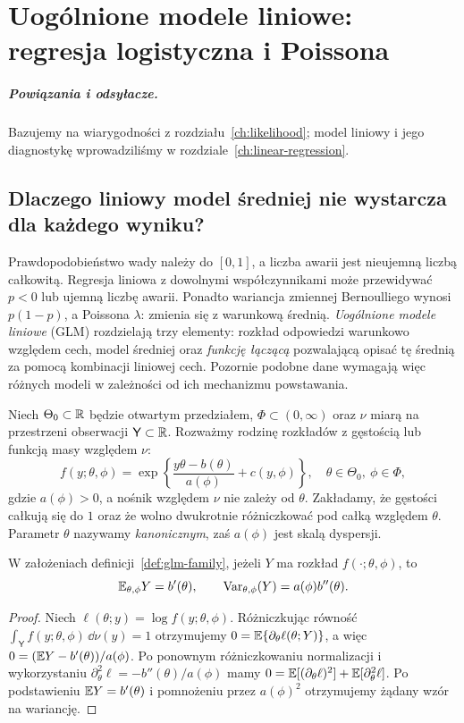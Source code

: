 \chapter{Uogólnione modele liniowe: regresja logistyczna i Poissona}
\label{ch:glm}
\paragraph{Powiązania i odsyłacze.} Bazujemy na wiarygodności z rozdziału~\ref{ch:likelihood}; model liniowy i jego diagnostykę wprowadziliśmy w rozdziale~\ref{ch:linear-regression}.


\section{Dlaczego liniowy model średniej nie wystarcza dla każdego wyniku?}
Prawdopodobieństwo wady należy do $[0,1]$, a liczba
awarii jest nieujemną liczbą całkowitą. Regresja
liniowa z dowolnymi współczynnikami może przewidywać
$p<0$ lub ujemną liczbę awarii. Ponadto wariancja
zmiennej Bernoulliego wynosi $p(1-p)$, a Poissona
$\lambda$: zmienia się z warunkową średnią.
\emph{Uogólnione modele liniowe} (GLM) rozdzielają
trzy elementy: rozkład odpowiedzi warunkowo względem
cech, model średniej oraz \emph{funkcję łączącą}
pozwalającą opisać tę średnią za pomocą kombinacji
liniowej cech. Pozornie podobne dane wymagają więc
różnych modeli w zależności od ich mechanizmu powstawania.

\begin{definicja}
\label{def:glm-family}
Niech $\Theta_0\subset\mathbb R$ będzie otwartym przedziałem,
$\Phi\subset(0,\infty)$ oraz $\nu$ miarą na przestrzeni
obserwacji $\mathsf Y\subset\mathbb R$. Rozważmy rodzinę
rozkładów z gęstością lub funkcją masy względem $\nu$:
\[
 f(y;\theta,\phi)=\exp\!\left\{
 \frac{y\theta-b(\theta)}{a(\phi)}+c(y,\phi)\right\},
 \quad \theta\in\Theta_0,\ \phi\in\Phi,
\]
gdzie $a(\phi)>0$, a nośnik względem $\nu$ nie zależy
od $\theta$. Zakładamy, że gęstości całkują się do $1$
oraz że wolno dwukrotnie różniczkować pod całką względem
$\theta$. Parametr $\theta$ nazywamy \emph{kanonicznym},
zaś $a(\phi)$ jest skalą dyspersji.
\end{definicja}

\begin{twierdzenie}
\label{thm:glm-moments}
W założeniach definicji~\ref{def:glm-family}, jeżeli
$Y$ ma rozkład $f(\cdot;\theta,\phi)$, to
\[
 \mathbb E_{\theta,\phi}Y=b'(\theta),\qquad
 \operatorname{Var}_{\theta,\phi}(Y)=a(\phi)b''(\theta).
\]
\end{twierdzenie}
\begin{proof}
Niech $\ell(\theta;y)=\log f(y;\theta,\phi)$.
Różniczkując równość
$\int_{\mathsf Y}f(y;\theta,\phi)\,\dd\nu(y)=1$
otrzymujemy
$0=\mathbb E\{\partial_\theta\ell(\theta;Y)\}$,
a więc $0=(\mathbb E Y-b'(\theta))/a(\phi)$.
Po ponownym różniczkowaniu normalizacji i
wykorzystaniu
$\partial_\theta^2\ell=-b''(\theta)/a(\phi)$
mamy
$0=\mathbb E[(\partial_\theta\ell)^2]+
\mathbb E[\partial_\theta^2\ell]$.
Po podstawieniu $\mathbb E Y=b'(\theta)$ i pomnożeniu przez
$a(\phi)^2$ otrzymujemy żądany wzór na wariancję.
\end{proof}

